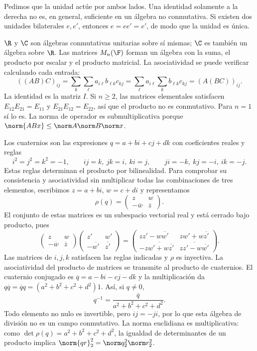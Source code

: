 Pedimos que la unidad actúe por ambos lados. Una identidad solamente a la derecha no es, en general, suficiente en un álgebra no conmutativa. Si existen dos unidades bilaterales $e,e'$, entonces $e=ee'=e'$, de modo que la unidad es única.

\begin{ejemplo}
$\R$ y $\C$ son álgebras conmutativas unitarias sobre sí mismas; $\C$ es también un álgebra sobre $\R$. Las matrices $M_n(\F)$ forman un álgebra con la suma, el producto por escalar y el producto matricial. La asociatividad se puede verificar calculando cada entrada:
\[
 ((AB)C)_{ij}=\sum_k\sum_\ell a_{i\ell}b_{\ell k}c_{kj}
 =\sum_\ell a_{i\ell}\sum_kb_{\ell k}c_{kj}=(A(BC))_{ij}.
\]
La identidad es la matriz $I$. Si $n\ge2$, las matrices elementales satisfacen $E_{12}E_{21}=E_{11}$ y $E_{21}E_{12}=E_{22}$, así que el producto no es conmutativo. Para $n=1$ sí lo es. La norma de operador es submultiplicativa porque $\norm{ABx}\le\norm A\norm B\norm x$.
\end{ejemplo}

\begin{ejemplo}
Los cuaternios son las expresiones $q=a+bi+cj+dk$ con coeficientes reales y reglas
\[
 i^2=j^2=k^2=-1,\qquad ij=k,\ jk=i,\ ki=j,
 \qquad ji=-k,\ kj=-i,\ ik=-j.
\]
Estas reglas determinan el producto por bilinealidad. Para comprobar su consistencia y asociatividad sin multiplicar todas las combinaciones de tres elementos, escribimos $z=a+bi$, $w=c+di$ y representamos
\[
 \rho(q)=\begin{pmatrix}z&w\\-\overline w&\overline z\end{pmatrix}.
\]
El conjunto de estas matrices es un subespacio vectorial real y está cerrado bajo producto, pues
\[
 \begin{pmatrix}z&w\\-\overline w&\overline z\end{pmatrix}
 \begin{pmatrix}z'&w'\\-\overline {w'}&\overline {z'}\end{pmatrix}
 =\begin{pmatrix}
 zz'-w\overline {w'}&zw'+w\overline {z'}\\
 -\overline{zw'+w\overline {z'}}&\overline{zz'-w\overline {w'}}
 \end{pmatrix}.
\]
Las matrices de $i,j,k$ satisfacen las reglas indicadas y $\rho$ es inyectiva. La asociatividad del producto de matrices se transmite al producto de cuaternios. El cuaternio conjugado es $\overline q=a-bi-cj-dk$ y la multiplicación da
$q\overline q=\overline q q=(a^2+b^2+c^2+d^2)1$. Así, si $q\ne0$,
\[
 q^{-1}=\frac{\overline q}{a^2+b^2+c^2+d^2}.
\]
Todo elemento no nulo es invertible, pero $ij=-ji$, por lo que esta álgebra de división no es un campo conmutativo. La norma euclidiana es multiplicativa: como $\det\rho(q)=a^2+b^2+c^2+d^2$, la igualdad de determinantes de un producto implica $\norm{qr}_2^2=\norm q_2^2\norm r_2^2$.
\end{ejemplo}

